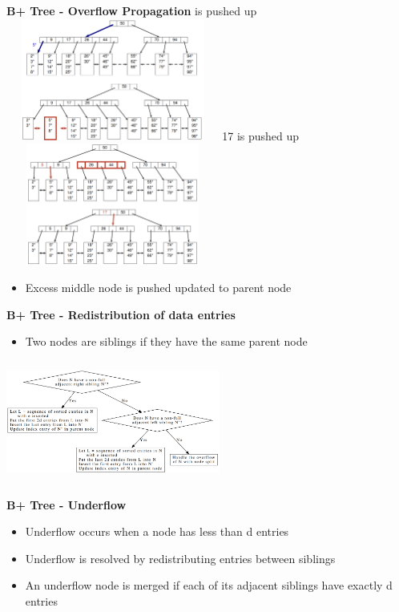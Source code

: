 \documentclass[10pt, landscape]{article}
\begin{document}
\begin{multicols}{4}
\textbf{B+ Tree - Overflow Propagation}
 is pushed up
\includegraphics[width=7cm, height=4cm]{overflow_progpagation1.png}
17 is pushed up
\includegraphics[width=7cm, height=4cm]{overflow_progpagation2.png}

\begin{itemize}
  \item Excess middle node is pushed updated to parent node
\end{itemize}

\textbf{B+ Tree - Redistribution of data entries}
\begin{itemize}
  \item Two nodes are siblings if they have the same parent node
\end{itemize}
\includegraphics[width=7cm, height=4cm]{overflow_redistribution.png}

\textbf{B+ Tree - Underflow}
\begin{itemize}
  \item Underflow occurs when a node has less than d entries
  \item Underflow is resolved by redistributing entries between siblings
  \item An underflow node is merged if each of its adjacent siblings have exactly d entries
\end{itemize}


\end{multicols}
\end{document}
